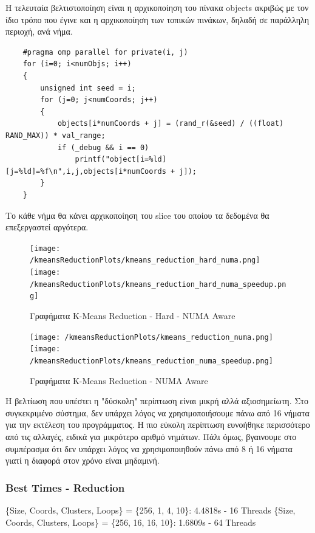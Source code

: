 \documentclass[../final_report.tex]{subfiles}
\begin{document}
Η τελευταία βελτιστοποίηση είναι η αρχικοποίηση του πίνακα objects ακριβώς με τον ίδιο τρόπο που έγινε και η αρχικοποίηση των
τοπικών πινάκων, δηλαδή σε παράλληλη περιοχή, ανά νήμα.

\begin{lstlisting}
    #pragma omp parallel for private(i, j)
    for (i=0; i<numObjs; i++)
    {
        unsigned int seed = i;
        for (j=0; j<numCoords; j++)
        {
            objects[i*numCoords + j] = (rand_r(&seed) / ((float) RAND_MAX)) * val_range;
            if (_debug && i == 0)
                printf("object[i=%ld][j=%ld]=%f\n",i,j,objects[i*numCoords + j]);
        }
    } 
\end{lstlisting}
Το κάθε νήμα θα κάνει αρχικοποίηση του slice του οποίου τα δεδομένα θα επεξεργαστεί αργότερα.

\begin{figure}[H]
    \centering
    \texttt{[image: /kmeansReductionPlots/kmeans\_reduction\_hard\_numa.png]}
    \texttt{[image: /kmeansReductionPlots/kmeans\_reduction\_hard\_numa\_speedup.png]}
    \caption{Γραφήματα K-Means Reduction - Hard - NUMA Aware}
\end{figure}

\begin{figure}[H]
    \centering
    \texttt{[image: /kmeansReductionPlots/kmeans\_reduction\_numa.png]}
    \texttt{[image: /kmeansReductionPlots/kmeans\_reduction\_numa\_speedup.png]}
    \caption{Γραφήματα K-Means Reduction - NUMA Aware}
    \label{fig:Γραφήματα K-Means Reduction - NUMA Aware}
\end{figure}

Η βελτίωση που υπέστει η "δύσκολη" περίπτωση είναι μικρή αλλά αξιοσημείωτη. Στο συγκεκριμένο σύστημα,
δεν υπάρχει λόγος να χρησιμοποιήσουμε πάνω από 16 νήματα για την εκτέλεση του προγράμματος.
Η πιο εύκολη περίπτωση ευνοήθηκε περισσότερο από τις αλλαγές, ειδικά για μικρότερο αριθμό νημάτων. Πάλι όμως,
βγαινουμε στο συμπέρασμα ότι δεν υπάρχει λόγος να χρησιμοποιηθούν πάνω από 8 ή 16 νήματα γιατί η διαφορά στον χρόνο
είναι μηδαμινή. 

\subsubsection*{Best Times - Reduction}

\{Size, Coords, Clusters, Loops\} = \{256, 1, 4, 10\}: 4.4818s - 16 Threads
\newline
\{Size, Coords, Clusters, Loops\} = \{256, 16, 16, 10\}: 1.6809s - 64 Threads
\newline
\end{document}
